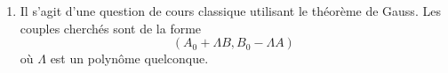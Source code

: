 \begin{enumerate}
\begin{enumerate}
\begin{multline*}
\begin{aligned}
 &x_1 &      &     &+x_4 &     &     &     &= 1  \\ 
 &    &x_2   &     &-x_4 &+x_5 &     &     &= 0  \\
 &    &      &x_3  &     &     &     &+x_7 &= 0  \\
 &    &      &     &     &-x_5 &+x_6 &-x_7 &= 0  \\
 &    &      &     &x_4 &-x_5 &+x_6 &-x_7 &= 0   \\
 &    &      &     &     &     &-x_6 &+x_7 &= -1 \\
 &    &      &     &     &     &     &-x_7 &= -1 \\
\end{aligned}
\right.
\Leftrightarrow
\begin{pmatrix}
 x_1 \\ x_2 \\  x_3 \\  x_4 \\  x_5 \\  x_6 \\  x_7 
\end{pmatrix}
=
\begin{pmatrix}
 1 \\ -1 \\  -1 \\  0 \\  1 \\  2 \\  1
\end{pmatrix}
\end{multline*}
On en tire
\begin{displaymath}
 A_0 = 1-X-X^2 \hspace{1cm} B_0 = X + 2X + X^3 
\end{displaymath}

 \item Il s'agit d'une question de cours classique utilisant le théorème de Gauss. Les couples cherchés sont de la forme
\begin{displaymath}
 \left( A_0 + \Lambda B, B_0 - \Lambda A\right) 
\end{displaymath}
où $\Lambda$ est un polynôme quelconque.
\end{enumerate}



\end{enumerate}
